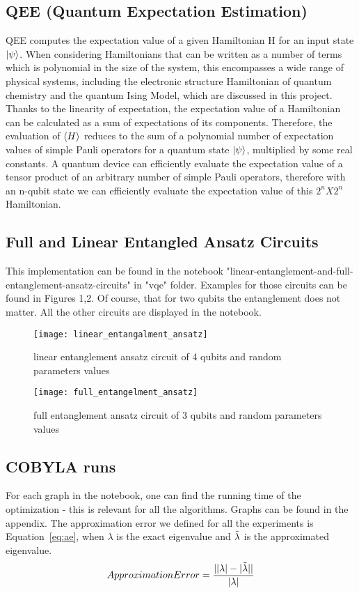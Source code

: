 \documentclass[12pt, a4paper]{article}
\newcommand{\eqnref}[1]{Equation~\ref{#1}}
\begin{document}
    \subsection{QEE (Quantum Expectation Estimation)}
    QEE computes the expectation value of a given
    Hamiltonian H for an input state $\ket{\psi}$.
    When considering Hamiltonians that can be written as a number of terms which is polynomial in the size of the system, this encompasses a wide
    range of physical systems, including the electronic structure Hamiltonian of quantum chemistry and the quantum Ising Model, which are discussed in this project.
    Thanks to the linearity of expectation, the expectation value of a Hamiltonian can be calculated as a sum of expectations of its components.
    Therefore, the evaluation of $\expval{H}$ reduces to the sum of a polynomial number of expectation values of simple Pauli operators for a quantum state $\ket{\psi}$,
    multiplied by some real constants. A quantum device
    can efficiently evaluate the expectation value of a tensor
    product of an arbitrary number of simple Pauli operators, therefore with an n-qubit state we can efficiently
    evaluate the expectation value of this ${2^n X 2^n}$ Hamiltonian.


    \subsection{Full and Linear Entangled Ansatz Circuits}
    This implementation can be found in the notebook "linear-entanglement-and-full-entanglement-ansatz-circuits" in "vqe" folder.
    Examples for those circuits can be found in Figures 1,2. Of course, that for two qubits the entanglement does not matter. All the other circuits are displayed in the notebook.

    \begin{figure}
        \texttt{[image: linear\_entangalment\_ansatz]}
        \centering
        \caption{linear entanglement ansatz circuit of 4 qubits and random parameters values}
    \end{figure}

    \begin{figure}
        \texttt{[image: full\_entangelment\_ansatz]}
        \centering
        \caption{full entanglement ansatz circuit of 3 qubits and random parameters values}
    \end{figure}

    \subsection{COBYLA runs}
    For each graph in the notebook, one can find the running time of the optimization - this is relevant for all the algorithms.
    Graphs can be found in the appendix.
    The approximation error we defined for all the experiments is \eqnref{eq:ae}, when $\lambda$ is the exact eigenvalue and $\Tilde{\lambda}$ is the approximated eigenvalue.
    \begin{equation}\label{eq:ae}
    Approximation Error = \dfrac{||\lambda|-|\Tilde{\lambda}||}{|\lambda|}
    \end{equation}
\end{document}
